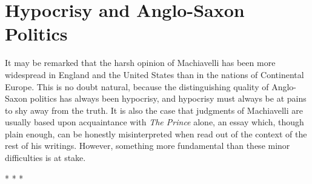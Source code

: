 \section{Hypocrisy and Anglo-Saxon Politics}

\begin{quotex}
It may be remarked that the harsh opinion of Machiavelli has been more widespread in England and the United States than in the nations of Continental Europe. This is no doubt natural, because the distinguishing quality of Anglo-Saxon politics has always been hypocrisy, and hypocrisy must always be at pains to shy away from the truth. It is also the case that judgments of Machiavelli are usually based upon acquaintance with \emph{The Prince} alone, an essay which, though plain enough, can be honestly misinterpreted when read out of the context of the rest of his writings. However, something more fundamental than these minor difficulties is at stake.

\end{quotex}


\begin{center}* * *\end{center}

